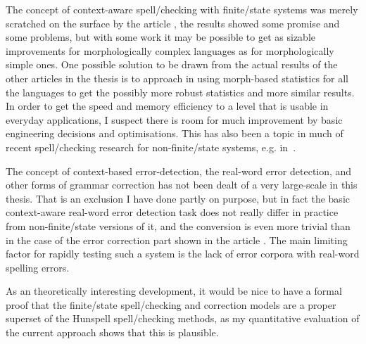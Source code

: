 \documentclass[officiallayout]{unihelcompling}
\begin{document}
The concept of context-aware spell\-/checking with finite\-/state systems was
merely scratched on the surface by the article
, the results showed some promise and some
problems, but with some work it may be possible to get as sizable improvements
for morphologically complex languages as for morphologically simple ones. One
possible solution to be drawn from the actual results of the other articles in
the thesis is to approach in using morph-based statistics for all the languages
to get the possibly more robust statistics and more similar results. In order
to get the speed and memory efficiency to a level that is usable in everyday
applications, I suspect there is room for much improvement by basic engineering
decisions and optimisations. This has also been a topic in much of recent
spell\-/checking research for non-finite\-/state systems, e.g.
in~\citep{carlson2001scaling}.

The concept of context-based error-detection, the real-word error detection,
and other forms of grammar correction has not been dealt of a very large-scale
in this thesis. That is an exclusion I have done partly on purpose, but in fact
the basic context-aware real-word error detection task does not really differ
in practice from non-finite\-/state versions of it, and the conversion is even
more trivial than in the case of the error correction part shown in the article
. The main limiting factor for rapidly testing
such a system is the lack of error corpora with real-word spelling errors.

As an theoretically interesting development, it would be nice to have a formal
proof that the finite\-/state spell\-/checking and correction models are a proper
superset of the Hunspell spell\-/checking methods, as my quantitative
evaluation of the current approach shows that this is plausible.





\end{document}
